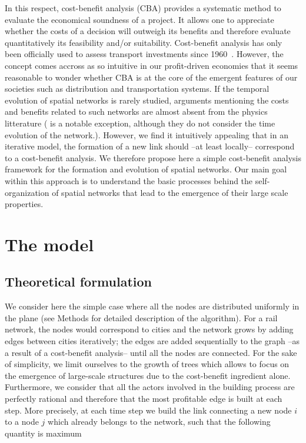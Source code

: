 In this respect, cost-benefit analysis (CBA) provides a systematic method to
evaluate the economical soundness of a project. It allows one to appreciate
whether the costs of a decision will outweigh its benefits and therefore
evaluate quantitatively its feasibility and/or suitability. Cost-benefit
analysis has only been officially used to assess transport investments since
1960~\cite{Coburn:1960}. However, the concept comes accross as so intuitive in
our profit-driven economies that it seems reasonable to wonder whether CBA is at
the core of the emergent features of our societies such as distribution and
transportation systems. If the temporal evolution of spatial networks is rarely
studied, arguments mentioning the costs and benefits related to such networks
are almost absent from the physics litterature (\cite{Popovic:2012} is a notable
exception, although they do not consider the time evolution of the network.).
However, we find it intuitively appealing that in an iterative model, the
formation of a new link should --at least locally-- correspond to a cost-benefit
analysis. We therefore propose here a simple cost-benefit analysis framework for
the formation and evolution of spatial networks. Our main goal within this
approach is to understand the basic processes behind the self-organization of
spatial networks that lead to the emergence of their large scale properties.




\section{The model}

\subsection{Theoretical formulation}
\label{sub:theoretical_formulation}

We consider here the simple case where all the nodes are distributed uniformly
in the plane (see Methods for detailed description of the algorithm). For a rail
network, the nodes would correspond to cities and the network grows by adding
edges between cities iteratively; the edges are added sequentially to the graph
--as a result of a cost-benefit analysis-- until all the nodes are connected.
For the sake of simplicity, we limit ourselves to the growth of trees which
allows to focus on the emergence of large-scale structures due to the
cost-benefit ingredient alone.  Furthermore, we consider that all the actors
involved in the building process are perfectly rational and therefore that the
most profitable edge is built at each step. More precisely, at each time step we
build the link connecting a new node $i$ to a node $j$ which already belongs to
the network, such that the following quantity is maximum

